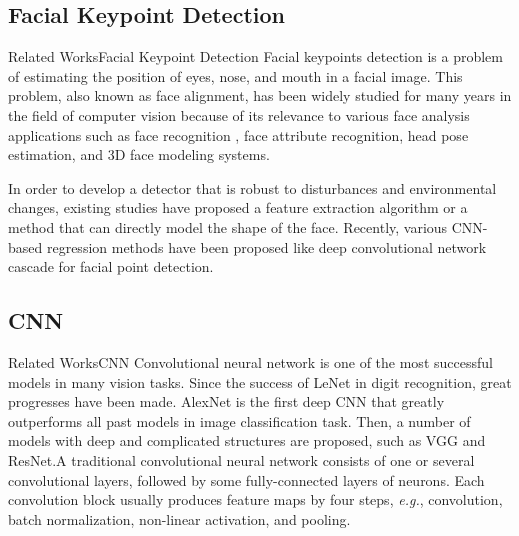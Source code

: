 \documentclass{beamer}
\begin{document}
\subsection{Facial Keypoint Detection}
\begin{frame}{Related Works}{Facial Keypoint Detection}
Facial keypoints detection is a problem of estimating the position of eyes, nose, and mouth in a facial image. This problem, also known as face alignment, has been widely studied for many years in the field of computer vision because of its relevance to various face analysis applications such as face recognition , face attribute recognition, head pose estimation, and 3D face modeling systems.

In order to develop a detector that is robust to disturbances and environmental changes, existing studies have proposed a feature extraction algorithm\cite{1717463,5539992} or a method that can directly model the shape of the face\cite{Cootes2000AnIT,10.1007/BFb0054760}. Recently, various CNN-based regression methods have been proposed like deep convolutional network cascade for facial point detection\cite{6619290}.
\end{frame}
\subsection{CNN}
\begin{frame}{Related Works}{CNN}
Convolutional neural network is one of the most successful models in many vision tasks. Since the success of LeNet\cite{726791} in digit recognition, great progresses have been made. AlexNet\cite{NIPS2012_c399862d} is the first deep CNN that greatly outperforms all past models in image classification task. Then, a number of models with deep and complicated structures are proposed, such as VGG\cite{brusilovsky:simonyan2014very} and ResNet\cite{7780459}.A traditional convolutional neural network consists of one or several convolutional layers, followed by some fully-connected layers of neurons. Each convolution block usually produces feature maps by four steps, \emph{e.g.}, convolution, batch normalization, non-linear activation, and pooling.
\end{frame}
\end{document}
